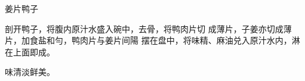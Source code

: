 \begin{recipe}{姜片鸭子}

\ingredients


\cooking

剖开鸭子，将腹内原汁水盛入碗中，去骨，将鸭肉片切 成薄片，子姜亦切成薄片，加食盐和勻，鸭肉片与姜片间陽 摆在盘中，将味精、麻油兑入原汁水内，淋在上面即成。

\notes

味清淡鲜美。

\end{recipe}

